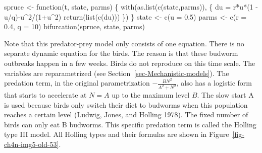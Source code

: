 \documentclass[
  a4paper,
  DIV=11,
  numbers=noendperiod,
  oneside]{scrreprt}
\newenvironment{Shaded}{\begin{snugshade}}{\end{snugshade}}
\newcommand{\AttributeTok}[1]{\textcolor[rgb]{0.40,0.45,0.13}{#1}}
\newcommand{\ControlFlowTok}[1]{\textcolor[rgb]{0.00,0.23,0.31}{#1}}
\newcommand{\DecValTok}[1]{\textcolor[rgb]{0.68,0.00,0.00}{#1}}
\newcommand{\FloatTok}[1]{\textcolor[rgb]{0.68,0.00,0.00}{#1}}
\newcommand{\FunctionTok}[1]{\textcolor[rgb]{0.28,0.35,0.67}{#1}}
\newcommand{\NormalTok}[1]{\textcolor[rgb]{0.00,0.23,0.31}{#1}}
\newcommand{\OtherTok}[1]{\textcolor[rgb]{0.00,0.23,0.31}{#1}}
\newcommand{\SpecialCharTok}[1]{\textcolor[rgb]{0.37,0.37,0.37}{#1}}
\begin{document}
\begin{Shaded}
\begin{Highlighting}[]
\NormalTok{spruce }\OtherTok{\textless{}{-}} \ControlFlowTok{function}\NormalTok{(t, state, parms) \{}
  \FunctionTok{with}\NormalTok{(}\FunctionTok{as.list}\NormalTok{(}\FunctionTok{c}\NormalTok{(state,parms)), \{}
\NormalTok{    du }\OtherTok{=}\NormalTok{ r}\SpecialCharTok{*}\NormalTok{u}\SpecialCharTok{*}\NormalTok{(}\DecValTok{1} \SpecialCharTok{{-}}\NormalTok{ u}\SpecialCharTok{/}\NormalTok{q)}\SpecialCharTok{{-}}\NormalTok{u}\SpecialCharTok{\^{}}\DecValTok{2}\SpecialCharTok{/}\NormalTok{(}\DecValTok{1}\SpecialCharTok{+}\NormalTok{u}\SpecialCharTok{\^{}}\DecValTok{2}\NormalTok{)}
    \FunctionTok{return}\NormalTok{(}\FunctionTok{list}\NormalTok{(}\FunctionTok{c}\NormalTok{(du)))}
\NormalTok{  \})}
\NormalTok{\}}
\NormalTok{state }\OtherTok{\textless{}{-}} \FunctionTok{c}\NormalTok{(}\AttributeTok{u =} \FloatTok{0.5}\NormalTok{)}
\NormalTok{parms }\OtherTok{\textless{}{-}} \FunctionTok{c}\NormalTok{(}\AttributeTok{r =} \FloatTok{0.4}\NormalTok{, }\AttributeTok{q =} \DecValTok{10}\NormalTok{)}
\FunctionTok{bifurcation}\NormalTok{(spruce, state, parms)}
\end{Highlighting}
\end{Shaded}

Note that this predator-prey model only consists of one equation. There
is no separate dynamic equation for the birds. The reason is that these
budworm outbreaks happen in a few weeks. Birds do not reproduce on this
time scale. The variables are reparametrized (see
Section~\ref{sec-Mechanistic-models}). The predation term, in the
original parametrization \(- \frac{BN^{2}}{A^{2} + N^{2}}\), also has a
logistic form that starts to accelerate at \(N = A\) up to the maximum
level \(B\). The slow start A is used because birds only switch their
diet to budworms when this population reaches a certain level (Ludwig,
Jones, and Holling 1978). The fixed number of birds can only eat B
budworms. This specific predation term is called the Holling type III
model. All Holling types and their formulas are shown in
Figure~\ref{fig-ch4n-img5-old-53}.
\end{document}
